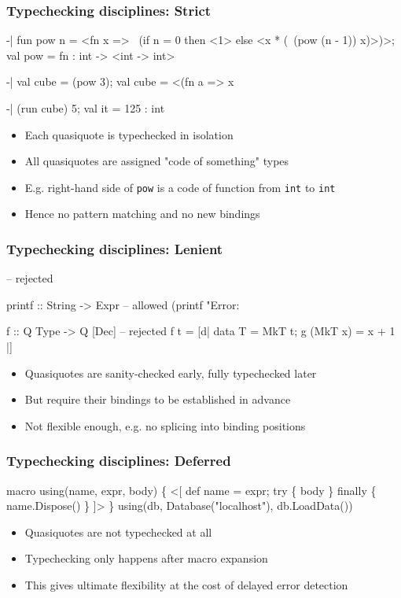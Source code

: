 \documentclass[svgnames,hyperref={bookmarks=false}]{beamer}
\begin{document}
\begin{frame}[fragile]
\frametitle{Typechecking disciplines: Strict}
\begin{semiverbatim}
-| fun pow n = <fn x =>
    ~(if n = 0 then <1> else <x * (~(pow (n - 1)) x)>)>;
val pow = fn : int -> <int -> int>

-| val cube = (pow 3);
val cube = <(fn a => x %

-| (run cube) 5;
val it = 125 : int

\end{semiverbatim}

\begin{itemize}
\item Each quasiquote is typechecked in isolation
\item All quasiquotes are assigned "code of something" types
\item E.g. right-hand side of \texttt{pow} is a code of function from \texttt{int} to \texttt{int}
\item Hence no pattern matching and no new bindings
\end{itemize}
\end{frame}

\begin{frame}[fragile]
\frametitle{Typechecking disciplines: Lenient}
\begin{semiverbatim}
[| 'a' + True |] -- rejected

printf :: String -> Expr -- allowed
{\textdollar}(printf "Error: %

f :: Q Type -> Q [Dec] -- rejected
f t = [d| data T = MkT {\textdollar}t; g (MkT x) = x + 1 |]

\end{semiverbatim}

\begin{itemize}
\item Quasiquotes are sanity-checked early, fully typechecked later
\item But require their bindings to be established in advance
\item Not flexible enough, e.g. no splicing into binding positions
\end{itemize}
\end{frame}

\begin{frame}[fragile]
\frametitle{Typechecking disciplines: Deferred}
\begin{semiverbatim}
macro using(name, expr, body) \{
  <[
    def {\textdollar}name = {\textdollar}expr;
    try \{ {\textdollar}body \} finally \{ {\textdollar}name.Dispose() \}
  ]>
\}
using(db, Database("localhost"), db.LoadData())

\end{semiverbatim}

\begin{itemize}
\item Quasiquotes are not typechecked at all
\item Typechecking only happens after macro expansion
\item This gives ultimate flexibility at the cost of delayed error detection
\end{itemize}
\end{frame}
\end{document}
